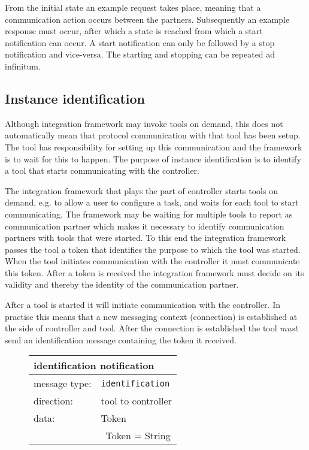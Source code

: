 \documentclass{article}
\newcommand{\msg}[1]{\texttt{#1}}
\begin{document}
   From the initial state an example request takes place, meaning that a
   communication action occurs between the partners. Subsequently an example
   response must occur, after which a state is reached from which a start
   notification can occur. A start notification can only be followed by a stop
   notification and vice-versa. The starting and stopping can be repeated ad
   infinitum.

  \subsection{Instance identification} \label{s:instance_identification}

   Although integration framework may invoke tools on demand, this does not
   automatically mean that protocol communication with that tool has been
   setup. The tool has responsibility for setting up this communication and the
   framework is to wait for this to happen.  The purpose of instance
   identification is to identify a tool that starts communicating with the
   controller.
   
   The integration framework that plays the part of controller starts tools on
   demand, e.g. to allow a user to configure a task, and waits for each tool to
   start communicating. The framework may be waiting for multiple tools to
   report as communication partner which makes it necessary to identify
   communication partners with tools that were started. To this end the
   integration framework passes the tool a token that identifies the purpose to
   which the tool was started.  When the tool initiates communication with the
   controller it must communicate this token. After a token is received the
   integration framework must decide on its validity and thereby the identity
   of the communication partner.   

   After a tool is started it will initiate communication with the controller.
   In practise this means that a new messaging context (connection) is
   established at the side of controller and tool.  After the connection is
   established the tool \emph{must} send an identification message containing
   the token it received.
   
   \begin{figure}[H]
    \begin{center}
     \begin{tabular}{|ll|}
      \hline
       \multicolumn{2}{|l|}{\textbf{identification notification}} \\
      \hline
       message type:    & \msg{identification} \\
      \hline
       direction:       & tool to controller \\
       data:            & Token \\
                        & \ Token = String \\
      \hline
     \end{tabular}
     \vspace{-0.3cm}
    \end{center}
   \end{figure}
\end{document}
